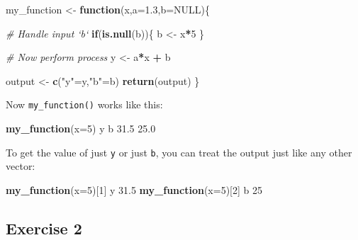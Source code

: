 \documentclass[]{book}
\newenvironment{Shaded}{\begin{snugshade}}{\end{snugshade}}
\newcommand{\CommentTok}[1]{\textcolor[rgb]{0.56,0.35,0.01}{\textit{#1}}}
\newcommand{\ControlFlowTok}[1]{\textcolor[rgb]{0.13,0.29,0.53}{\textbf{#1}}}
\newcommand{\DataTypeTok}[1]{\textcolor[rgb]{0.13,0.29,0.53}{#1}}
\newcommand{\DecValTok}[1]{\textcolor[rgb]{0.00,0.00,0.81}{#1}}
\newcommand{\FloatTok}[1]{\textcolor[rgb]{0.00,0.00,0.81}{#1}}
\newcommand{\KeywordTok}[1]{\textcolor[rgb]{0.13,0.29,0.53}{\textbf{#1}}}
\newcommand{\NormalTok}[1]{#1}
\newcommand{\OperatorTok}[1]{\textcolor[rgb]{0.81,0.36,0.00}{\textbf{#1}}}
\newcommand{\OtherTok}[1]{\textcolor[rgb]{0.56,0.35,0.01}{#1}}
\newcommand{\StringTok}[1]{\textcolor[rgb]{0.31,0.60,0.02}{#1}}
\begin{document}
\begin{Shaded}
\begin{Highlighting}[]
\NormalTok{my_function <-}\StringTok{ }\ControlFlowTok{function}\NormalTok{(x,}\DataTypeTok{a=}\FloatTok{1.3}\NormalTok{,}\DataTypeTok{b=}\OtherTok{NULL}\NormalTok{)\{}
  
  \CommentTok{# Handle input `b`}
  \ControlFlowTok{if}\NormalTok{(}\KeywordTok{is.null}\NormalTok{(b))\{}
\NormalTok{    b <-}\StringTok{ }\NormalTok{x}\OperatorTok{*}\DecValTok{5}
\NormalTok{  \}}
  
  \CommentTok{# Now perform process}
\NormalTok{  y <-}\StringTok{ }\NormalTok{a}\OperatorTok{*}\NormalTok{x }\OperatorTok{+}\StringTok{ }\NormalTok{b}
  
\NormalTok{  output <-}\StringTok{ }\KeywordTok{c}\NormalTok{(}\StringTok{"y"}\NormalTok{=y,}\StringTok{"b"}\NormalTok{=b) }
  \KeywordTok{return}\NormalTok{(output)}
\NormalTok{\}}
\end{Highlighting}
\end{Shaded}

Now \texttt{my\_function()} works like this:

\begin{Shaded}
\begin{Highlighting}[]
\KeywordTok{my_function}\NormalTok{(}\DataTypeTok{x=}\DecValTok{5}\NormalTok{)}
\NormalTok{   y    b }
\FloatTok{31.5} \FloatTok{25.0} 
\end{Highlighting}
\end{Shaded}

To get the value of just \texttt{y} or just \texttt{b}, you can treat the output just like any other vector:

\begin{Shaded}
\begin{Highlighting}[]
\KeywordTok{my_function}\NormalTok{(}\DataTypeTok{x=}\DecValTok{5}\NormalTok{)[}\DecValTok{1}\NormalTok{]}
\NormalTok{   y }
\FloatTok{31.5} 
\KeywordTok{my_function}\NormalTok{(}\DataTypeTok{x=}\DecValTok{5}\NormalTok{)[}\DecValTok{2}\NormalTok{]}
\NormalTok{ b }
\DecValTok{25} 
\end{Highlighting}
\end{Shaded}

\hypertarget{exercise-2}{%
\subsection*{Exercise 2}\label{exercise-2}}
\end{document}
